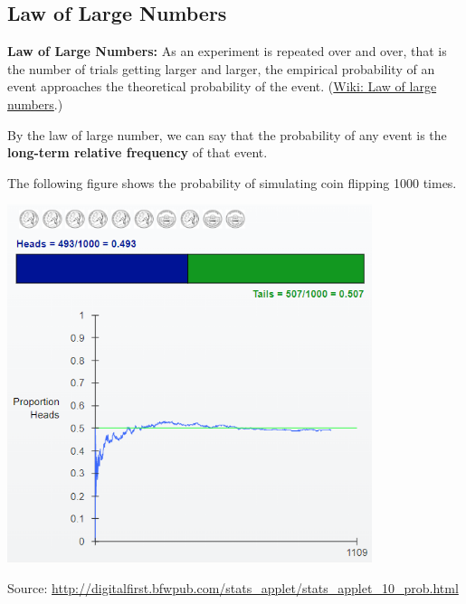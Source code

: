 



\hypertarget{law-of-large-numbers}{%
\subsection{Law of Large Numbers}\label{law-of-large-numbers}}

\textbf{Law of Large Numbers:} As an experiment is repeated over and
over, that is the number of trials getting larger and larger, the
empirical probability of an event approaches the theoretical
probability of the event.
(\href{https://en.wikipedia.org/wiki/Law_of_large_numbers}{Wiki: Law
of large numbers}.)

By the law of large number, we can say that the probability of any
event is the \textbf{long-term relative frequency} of that event.

\begin{example}

The following figure shows the probability of simulating coin flipping 1000 times.

\includegraphics[width=0.8\textwidth]{Figures/Law-Large-Number.png}

Source:
\url{http://digitalfirst.bfwpub.com/stats_applet/stats_applet_10_prob.html}

\end{example}


